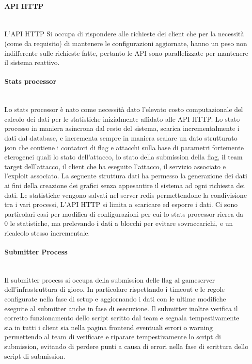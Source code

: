 \documentclass[11pt]{article}
\begin{document}
\paragraph{API HTTP}\mbox{}\\

L'API HTTP Si occupa di rispondere alle richieste dei client che per la necessità (come da requisito) di mantenere le configurazioni aggiornate, hanno un peso non indifferente sulle richieste fatte, pertanto le API sono parallelizzate per mantenere il sistema reattivo.
\paragraph{Stats processor}\mbox{}\\
Lo stats processor è nato come necessità dato l'elevato costo computazionale del calcolo dei dati per le statistiche inizialmente affidato alle API HTTP. Lo stato processo in maniera asincrona dal resto del sistema, scarica incrementalmente i dati dal database, e incrementa sempre in maniera scalare un dato strutturato json che contiene i contatori di flag e attacchi sulla base di parametri fortemente eterogenei quali lo stato dell'attacco, lo stato della submission della flag, il team target dell'attacco, il client che ha eseguito l'attacco, il servizio associato e l'exploit associato. La seguente struttura dati ha permesso la generazione dei dati ai fini della creazione dei grafici senza appesantire il sistema ad ogni richiesta dei dati. Le statistiche vengono salvati nel server redis permettendone la condivisione tra i vari processi, L'API HTTP si limita a scaricare ed esporre i dati. Ci sono particolari casi per modifica di configurazioni per cui lo stats processor ricrea da 0 le statistiche, ma prelevando i dati a blocchi per evitare sovraccarichi, e un ricalcolo stesso incrementale.
\paragraph{Submitter Process}\mbox{}\\
Il submitter process si occupa della submission delle flag al gameserver dell'infrastruttura di gioco. In particolare rispettando i timeout e le regole configurate nella fase di setup e aggiornando i dati con le ultime modifiche eseguite al submitter anche in fase di esecuzione.
Il submitter inoltre verifica il corretto funzionamento dello script scritto dal team e segnala tempestivamente sia in tutti i client sia nella pagina frontend eventuali errori o warning permettendo al team di verificare e riparare tempestivamente lo script di submission, evitando di perdere punti a causa di errori nella fase di scrittura dello script di submission.
\end{document}
